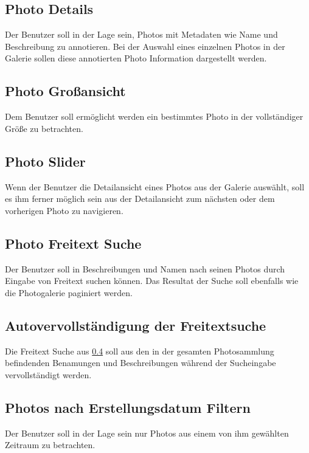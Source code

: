 \subsection{Photo Details}

Der Benutzer soll in der Lage sein, Photos mit Metadaten wie Name und Beschreibung zu annotieren. Bei der Auswahl eines einzelnen Photos in 
der Galerie sollen diese annotierten Photo Information dargestellt werden.

\subsection{Photo Großansicht}

Dem Benutzer soll ermöglicht werden ein bestimmtes Photo in der vollständiger Größe zu betrachten.

\subsection{Photo Slider}

Wenn der Benutzer die Detailansicht eines Photos aus der Galerie auswählt, soll es ihm ferner möglich sein aus der Detailansicht zum nächsten oder dem vorherigen Photo zu navigieren. 

\subsection{Photo Freitext Suche}
\label{ssec:photo_freitext_suche}

Der Benutzer soll in Beschreibungen und Namen nach seinen Photos durch Eingabe von Freitext suchen können. Das Resultat der Suche soll ebenfalls wie die Photogalerie paginiert werden.

\subsection{Autovervollständigung der Freitextsuche}

Die Freitext Suche aus \ref{ssec:photo_freitext_suche} soll aus den in der gesamten Photosammlung befindenden Benamungen und Beschreibungen während der 
Sucheingabe vervollständigt werden.

\subsection{Photos nach Erstellungsdatum Filtern}

Der Benutzer soll in der Lage sein nur Photos aus einem von ihm gewählten Zeitraum zu betrachten. 



